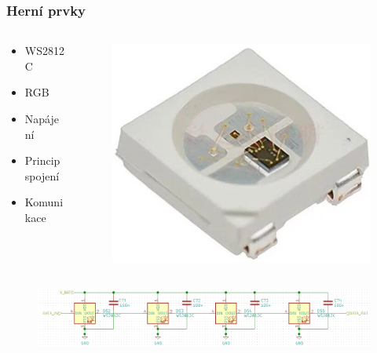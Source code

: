 \documentclass[%
  12pt,       				%
	t,                  %
	aspectratio=1610,   %
	unicode,						%
]{beamer}				    	%
\begin{document}
\begin{frame} 
	\frametitle{Herní prvky}
	\begin{columns}[T] 								%
		\begin{column}{0.4\textwidth}		%
			\vspace{0.5cm}
			\begin{itemize}
				\item WS2812C
				\item RGB
				\item Napájení
				\item Princip spojení
				\item Komunikace
			\end{itemize}
		\end{column}
		\begin{column}{0.7\textwidth}		%
			\begin{figure}%
				\centering
				\includegraphics[width=0.3\columnwidth]{obrazky/WS2812C.jpg}
			\end{figure}
		\end{column}
	\end{columns}	
	
	\begin{figure}%
		\centering
		\vspace{0.5cm}	              %
		\includegraphics[width=1\columnwidth]{obrazky/WS2812C_spojeni.png}
	\end{figure}%
\end{frame}
\end{document}
